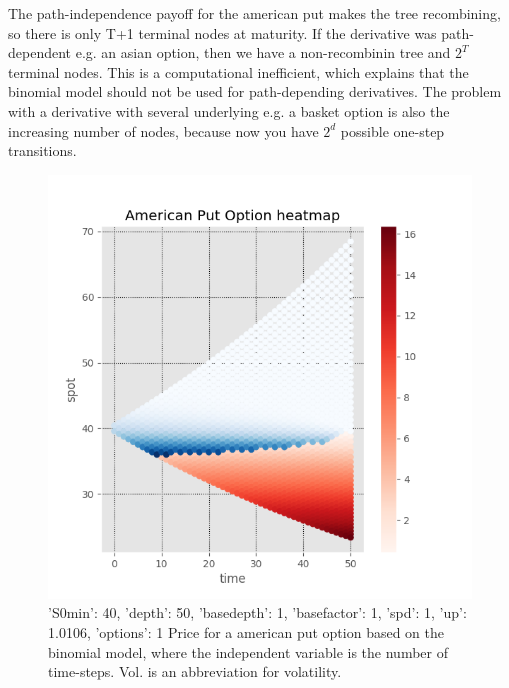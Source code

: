 The path-independence payoff for the american put makes the tree recombining, so there is only T+1 terminal nodes at maturity. If the derivative was path-dependent e.g. an asian option, then we have a non-recombinin tree and $2^{T}$ terminal nodes. This is a computational inefficient, which explains that the binomial model should not be used for path-depending derivatives. The problem with a derivative with several underlying e.g. a basket option is also the increasing number of nodes, because now you have $2^d$ possible one-step transitions.\\

\begin{figure}[H]
\centering
\includegraphics{Figures/BinomialTree.png}
\decoRule
\caption[Convergence Of Binomial Model]{{'S0min': 40, 'depth': 50, 'basedepth': 1, 'basefactor': 1, 'spd': 1, 'up': 1.0106, 'options': 1} Price for a american put option based on the binomial model, where the independent variable is the number of time-steps. Vol. is an abbreviation for volatility.}
\label{fig:BinomialTree}
\end{figure}


